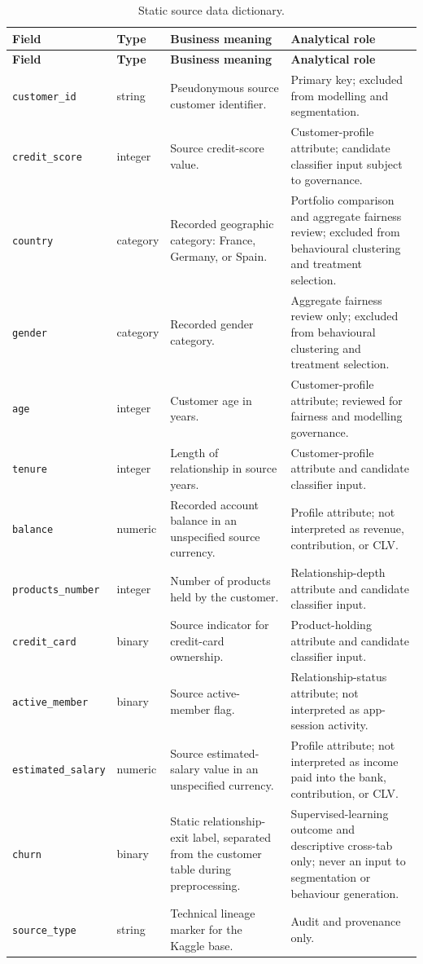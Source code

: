 \documentclass[a4paper,12pt]{article}
\begin{document}
\begin{longtable}{P{0.22\textwidth}P{0.16\textwidth}P{0.34\textwidth}Y}
\caption{Static source data dictionary.}\label{tab:source-data-dictionary}\\
\toprule
\textbf{Field} & \textbf{Type} & \textbf{Business meaning} & \textbf{Analytical role}\\
\midrule
\endfirsthead
\toprule
\textbf{Field} & \textbf{Type} & \textbf{Business meaning} & \textbf{Analytical role}\\
\midrule
\endhead
\texttt{customer\_id} & string & Pseudonymous source customer identifier. & Primary key; excluded from modelling and segmentation.\\
\texttt{credit\_score} & integer & Source credit-score value. & Customer-profile attribute; candidate classifier input subject to governance.\\
\texttt{country} & category & Recorded geographic category: France, Germany, or Spain. & Portfolio comparison and aggregate fairness review; excluded from behavioural clustering and treatment selection.\\
\texttt{gender} & category & Recorded gender category. & Aggregate fairness review only; excluded from behavioural clustering and treatment selection.\\
\texttt{age} & integer & Customer age in years. & Customer-profile attribute; reviewed for fairness and modelling governance.\\
\texttt{tenure} & integer & Length of relationship in source years. & Customer-profile attribute and candidate classifier input.\\
\texttt{balance} & numeric & Recorded account balance in an unspecified source currency. & Profile attribute; not interpreted as revenue, contribution, or CLV.\\
\texttt{products\_number} & integer & Number of products held by the customer. & Relationship-depth attribute and candidate classifier input.\\
\texttt{credit\_card} & binary & Source indicator for credit-card ownership. & Product-holding attribute and candidate classifier input.\\
\texttt{active\_member} & binary & Source active-member flag. & Relationship-status attribute; not interpreted as app-session activity.\\
\texttt{estimated\_salary} & numeric & Source estimated-salary value in an unspecified currency. & Profile attribute; not interpreted as income paid into the bank, contribution, or CLV.\\
\texttt{churn} & binary & Static relationship-exit label, separated from the customer table during preprocessing. & Supervised-learning outcome and descriptive cross-tab only; never an input to segmentation or behaviour generation.\\
\texttt{source\_type} & string & Technical lineage marker for the Kaggle base. & Audit and provenance only.\\
\bottomrule
\end{longtable}



\end{document}
